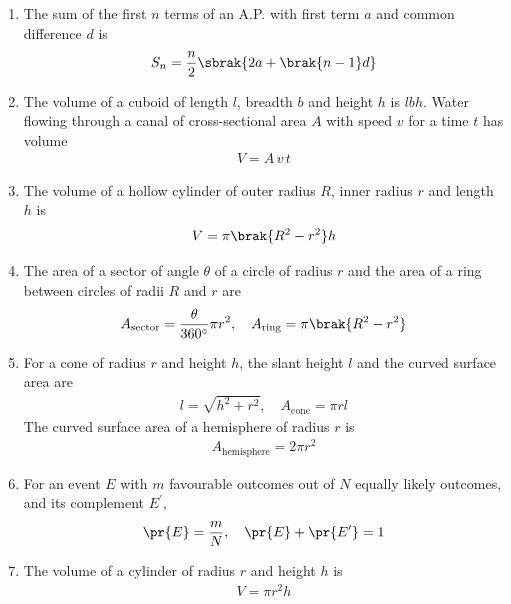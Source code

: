 \begin{enumerate}[label=\thesubsection.\arabic*, ref=\thesubsection.\theenumi]
\item The sum of the first $n$ terms of an A.P. with first term $a$ and common difference $d$ is
\begin{align}
	S_n = \frac{n}{2}\sbrak{2a + \brak{n-1}d}
	\label{eq:EE26BTECH11229-ap-sum}
\end{align}
\item The volume of a cuboid of length $l$, breadth $b$ and height $h$ is $lbh$. Water flowing through a canal of cross-sectional area $A$ with speed $v$ for a time $t$ has volume
\begin{align}
	V = A\,v\,t
	\label{eq:EE26BTECH11229-flow}
\end{align}
\item The volume of a hollow cylinder of outer radius $R$, inner radius $r$ and length $h$ is
\begin{align}
	V = \pi\brak{R^2 - r^2}h
	\label{eq:EE26BTECH11229-hollow-cyl}
\end{align}
\item The area of a sector of angle $\theta$ of a circle of radius $r$ and the area of a ring between circles of radii $R$ and $r$ are
\begin{align}
	A_{\text{sector}} = \frac{\theta}{360^{\circ}}\pi r^2, \quad
	A_{\text{ring}} = \pi\brak{R^2 - r^2}
	\label{eq:EE26BTECH11229-sector}
\end{align}
\item For a cone of radius $r$ and height $h$, the slant height $l$ and the curved surface area are
\begin{align}
	l = \sqrt{h^2 + r^2}, \quad A_{\text{cone}} = \pi r l
	\label{eq:EE26BTECH11229-cone}
\end{align}
The curved surface area of a hemisphere of radius $r$ is
\begin{align}
	A_{\text{hemisphere}} = 2\pi r^2
	\label{eq:EE26BTECH11229-hemisphere}
\end{align}
\item For an event $E$ with $m$ favourable outcomes out of $N$ equally likely outcomes, and its complement $E^{\prime}$,
\begin{align}
	\pr{E} = \frac{m}{N}, \quad \pr{E} + \pr{E^{\prime}} = 1
	\label{eq:EE26BTECH11229-prob-def}
\end{align}
\item The volume of a cylinder of radius $r$ and height $h$ is
\begin{align}
	V = \pi r^2 h
	\label{eq:EE26BTECH11229-cylinder}
\end{align}

\end{enumerate}
